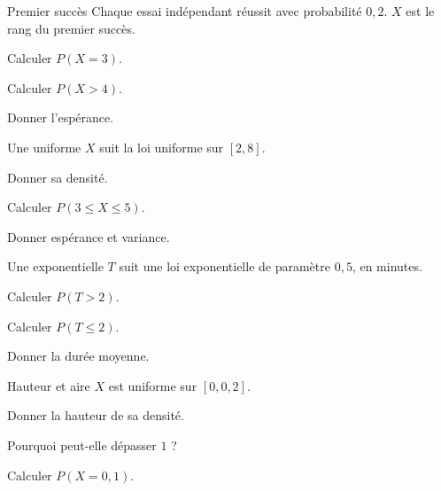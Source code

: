 \exercices
{}
\begingroup\renewcommand{\otBesoinPlace}[1]{}\begin{minipage}{\linewidth}
\begin{exercice}[1]{Premier succès}
Chaque essai indépendant réussit avec probabilité $0{,}2$. $X$ est le rang du premier succès.
\begin{questions}
\item Calculer $P(X=3)$.
\item Calculer $P(X>4)$.
\item Donner l’espérance.
\end{questions}
\end{exercice}
\begin{exercice}[1]{Une uniforme}
$X$ suit la loi uniforme sur $[2,8]$.
\begin{questions}
\item Donner sa densité.
\item Calculer $P(3\leq X\leq5)$.
\item Donner espérance et variance.
\end{questions}
\end{exercice}
\begin{exercice}[1]{Une exponentielle}
$T$ suit une loi exponentielle de paramètre $0{,}5$, en minutes.
\begin{questions}
\item Calculer $P(T>2)$.
\item Calculer $P(T\leq2)$.
\item Donner la durée moyenne.
\end{questions}
\end{exercice}
\begin{exercice}[1]{Hauteur et aire}
$X$ est uniforme sur $[0,0{,}2]$.
\begin{questions}
\item Donner la hauteur de sa densité.
\item Pourquoi peut-elle dépasser $1$ ?
\item Calculer $P(X=0{,}1)$.
\end{questions}
\end{exercice}
\end{minipage}\endgroup
\clearpage
{}
